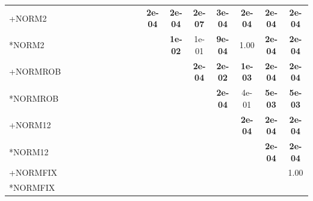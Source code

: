 \begin{table}[t]
{\begin{tabular}{lcccccccccccccccc}
+NORM2 &  &  &  &  &  &  &  &  &  & \textbf{2e-04} & \textbf{2e-04} & \textbf{2e-07} & \textbf{3e-04} & \textbf{2e-04} & \textbf{2e-04} & \textbf{2e-04} \\
*NORM2 &  &  &  &  &  &  &  &  &  &  & \textbf{1e-02} & 1e-01 & \textbf{9e-04} & 1.00 & \textbf{2e-04} & \textbf{2e-04} \\
+NORMROB &  &  &  &  &  &  &  &  &  &  &  & \textbf{2e-04} & \textbf{2e-02} & \textbf{1e-03} & \textbf{2e-04} & \textbf{2e-04} \\
*NORMROB &  &  &  &  &  &  &  &  &  &  &  &  & \textbf{2e-04} & 4e-01 & \textbf{5e-03} & \textbf{5e-03} \\
+NORM12 &  &  &  &  &  &  &  &  &  &  &  &  &  & \textbf{2e-04} & \textbf{2e-04} & \textbf{2e-04} \\
*NORM12 &  &  &  &  &  &  &  &  &  &  &  &  &  &  & \textbf{2e-04} & \textbf{2e-04} \\
+NORMFIX &  &  &  &  &  &  &  &  &  &  &  &  &  &  &  & 1.00 \\
*NORMFIX &  &  &  &  &  &  &  &  &  &  &  &  &  &  &  &  \\
\bottomrule
\end{tabular}
}
\end{table}

